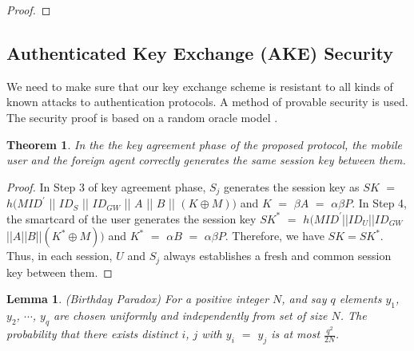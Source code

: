 \documentclass[a4paper,12pt]{report}
\newtheorem{theorem}{Theorem}
\newtheorem{lemma}{Lemma}
\begin{document}
\begin{proof}
\end{proof}


\subsection{Authenticated Key Exchange (AKE) Security}
We need to make sure that our key exchange scheme is resistant to
all kinds of known attacks to authentication protocols. A method of
provable security is used. The security proof is based on a random
oracle model \cite{bellare}.

\begin{theorem}
In the the key agreement phase of the proposed protocol, the mobile user
and the foreign agent correctly generates the same session key between them.
\end{theorem}

\begin{proof}
In Step 3 of key agreement phase, $S_{j}$ generates the session key
as $SK$ $=$ $h(MID^{\prime}$ || $ID_S$ || $ID_{GW}$ || $A$ || $B$ ||
$(K\oplus M))$ and $K$ $=$ $\beta A$ $=$ $\alpha \beta P $. In Step
4, the smartcard of the user generates the session key $SK^*$ $=$
$h(MID^{\prime}$||$ID_U$||$ID_{GW}$||$A$||$B$||$(K^* \oplus M))$ and
$K^*$ $=$ $\alpha B$ $=$ $\alpha \beta P$. Therefore, we have $SK =
SK^*$. Thus, in each session, $U$ and $S_{j}$ always establishes a
fresh and common session key between them.
\end{proof}

\begin{lemma}
\label{Bday}(Birthday Paradox) For a positive integer $N$, and say
$q$ elements $y_1$, $y_2$, $\cdots$, $y_q$  are chosen uniformly and
independently from set of size $N$. The probability that there
exists distinct $i$, $j$ with $y_i$ $=$ $y_j$ is at most
$\frac{q^2}{2N}$.
\end{lemma}
\end{document}
